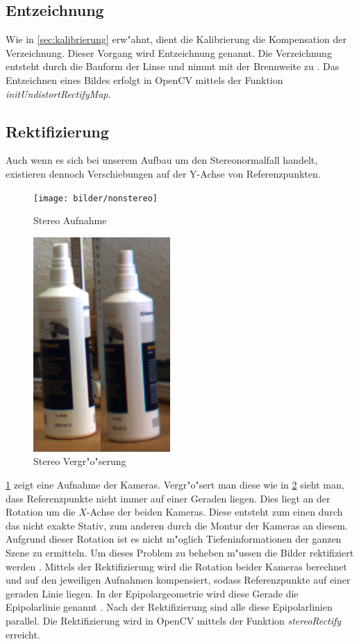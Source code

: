 \subsection{Entzeichnung}
\label{sec:entzeichnung}

Wie in \ref{sec:kalibrierung} erw"ahnt, dient die Kalibrierung die Kompensation der Verzeichnung. Dieser Vorgang wird Entzeichnung genannt. Die Verzeichnung entsteht durch die Bauform der Linse und nimmt mit der Brennweite zu \cite{wie}. Das Entzeichnen eines Bildes erfolgt in OpenCV mittels der Funktion \textit{initUndistortRectifyMap}.

\subsection{Rektifizierung}
\label{sec:rektifizierung}

\noindent Auch wenn es sich bei unserem Aufbau um den Stereonormalfall handelt, existieren dennoch Verschiebungen auf der Y-Achse von Referenzpunkten.

\begin{figure}[H]
	\texttt{[image: bilder/nonstereo]}
	\caption[Stereo Szenenaufnahme]{Stereo Aufnahme}
	\label{fig:steresene}%
\end{figure}

\begin{figure}[H]
	\includegraphics[scale=0.4]{bilder/nonparallal}
	\caption[Stereo Vergr"o"serung]{Stereo Vergr"o"serung}
	\label{fig:vergr}%
\end{figure}

\noindent \ref{fig:steresene} zeigt eine Aufnahme der Kameras. Vergr"o"sert man diese wie in \ref{fig:vergr} sieht man, dass Referenzpunkte nicht immer auf einer Geraden liegen. Dies liegt an der Rotation um die $X$-Achse der beiden Kameras. Diese entsteht zum einen durch das nicht exakte Stativ, zum anderen durch die Montur der Kameras an diesem. Aufgrund dieser Rotation ist es nicht m"oglich Tiefeninformationen der ganzen Szene zu ermitteln. Um dieses Problem zu beheben m"ussen die Bilder rektifiziert werden \cite{zbs}. Mittels der Rektifizierung wird die Rotation beider Kameras berechnet und auf den jeweiligen Aufnahmen kompensiert, sodass Referenzpunkte auf einer geraden Linie liegen. In der Epipolargeometrie wird diese Gerade die Epipolarlinie genannt \cite{ocvs} \cite{wepi}. Nach der Rektifizierung sind alle diese Epipolarlinien parallel. Die Rektifizierung wird in OpenCV mittels der Funktion \textit{stereoRectify} erreicht.

